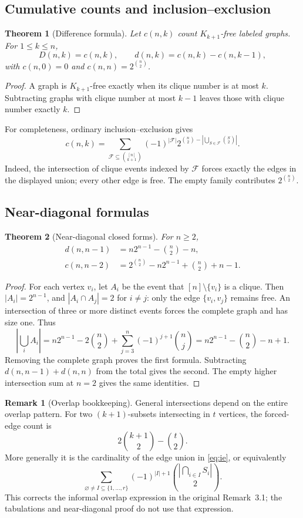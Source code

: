 \documentclass[11pt,a4paper]{article}
\newtheorem{theorem}{Theorem}[section]
\theoremstyle{definition}
\newtheorem{remark}{Remark}[section]
\begin{document}
\subsection{Cumulative counts and inclusion--exclusion}
\begin{theorem}[Difference formula]
Let $c(n,k)$ count $K_{k+1}$-free labeled graphs. For $1\leq k\leq n$,
\[
 D(n,k)=c(n,k),\qquad d(n,k)=c(n,k)-c(n,k-1),
\]
with $c(n,0)=0$ and $c(n,n)=2^{\binom n2}$.
\end{theorem}
\begin{proof}
A graph is $K_{k+1}$-free exactly when its clique number is at most $k$.
Subtracting graphs with clique number at most $k-1$ leaves those
with clique number exactly $k$.
\end{proof}
For completeness, ordinary inclusion--exclusion gives
\begin{equation}\label{eq:ie}
 c(n,k)=\sum_{\mathcal F\subseteq\binom{[n]}{k+1}}
 (-1)^{|\mathcal F|}
 2^{\binom n2-\left|\bigcup_{S\in\mathcal F}\binom S2\right|}.
\end{equation}
Indeed, the intersection of clique events indexed by $\mathcal F$
forces exactly the edges in the displayed union; every other edge is
free. The empty family contributes $2^{\binom n2}$.

\subsection{Near-diagonal formulas}
\begin{theorem}[Near-diagonal closed forms]
For $n\geq2$,
\begin{align*}
 d(n,n-1)&=n2^{n-1}-\binom n2-n,\\
 c(n,n-2)&=2^{\binom n2}-n2^{n-1}+\binom n2+n-1.
\end{align*}
\end{theorem}
\begin{proof}
For each vertex $v_i$, let $A_i$ be the event that $[n]\setminus\{v_i\}$
is a clique. Then $|A_i|=2^{n-1}$, and $|A_i\cap A_j|=2$ for
$i\neq j$: only the edge $\{v_i,v_j\}$ remains free. An intersection
of three or more distinct events forces the complete graph and has
size one. Thus
\[
 \left|\bigcup_i A_i\right|
 =n2^{n-1}-2\binom n2+
 \sum_{j=3}^{n}(-1)^{j+1}\binom nj
 =n2^{n-1}-\binom n2-n+1.
\]
Removing the complete graph proves the first formula. Subtracting
$d(n,n-1)+d(n,n)$ from the total gives the second. The empty higher
intersection sum at $n=2$ gives the same identities.
\end{proof}
\begin{remark}[Overlap bookkeeping]\label{rem:overlap}
General intersections depend on the entire overlap pattern.
For two $(k+1)$-subsets intersecting in $t$ vertices, the forced-edge
count is
\[
 2\binom{k+1}{2}-\binom t2.
\]
More generally it is the cardinality of the edge union in
\eqref{eq:ie}, or equivalently
\[
 \sum_{\varnothing\neq I\subseteq\{1,\ldots,r\}}
 (-1)^{|I|+1}\binom{\left|\bigcap_{i\in I}S_i\right|}{2}.
\]
This corrects the informal overlap expression in the original
Remark~3.1; the tabulations and near-diagonal proof do not use that
expression.
\end{remark}
\end{document}
